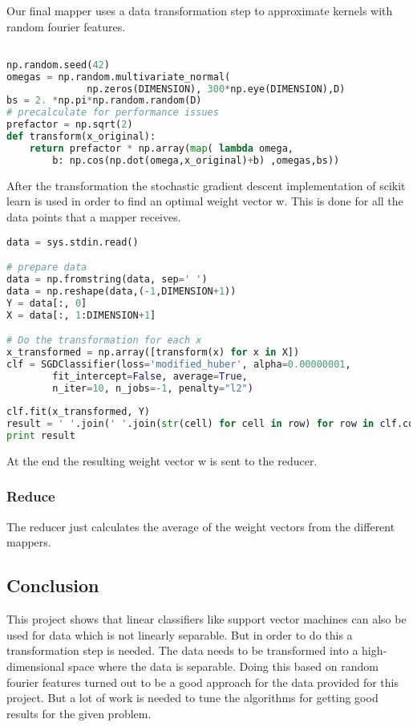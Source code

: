 \documentclass[a4paper, 11pt]{article}
\begin{document}
Our final mapper uses a data transformation step to approximate kernels with random fourier features.

\begin{lstlisting}[language=Python]

np.random.seed(42)
omegas = np.random.multivariate_normal(
              np.zeros(DIMENSION), 300*np.eye(DIMENSION),D)
bs = 2. *np.pi*np.random.random(D)
# precalculate for performance issues
prefactor = np.sqrt(2) 
def transform(x_original):
	return prefactor * np.array(map( lambda omega,
		b: np.cos(np.dot(omega,x_original)+b) ,omegas,bs))

\end{lstlisting}

After the transformation the stochastic gradient descent implementation of scikit learn is used in order to find an optimal weight vector w. This is done for all the data points that a mapper receives.

\begin{lstlisting}[language=Python]
data = sys.stdin.read()

# prepare data
data = np.fromstring(data, sep=' ')
data = np.reshape(data,(-1,DIMENSION+1))
Y = data[:, 0]
X = data[:, 1:DIMENSION+1]

# Do the transformation for each x
x_transformed = np.array([transform(x) for x in X])
clf = SGDClassifier(loss='modified_huber', alpha=0.00000001, 
		fit_intercept=False, average=True, 
		n_iter=10, n_jobs=-1, penalty="l2")
    
clf.fit(x_transformed, Y)
result = ' '.join(' '.join(str(cell) for cell in row) for row in clf.coef_)
print result

\end{lstlisting}

At the end the resulting weight vector w is sent to the reducer.

\subsubsection{Reduce}

The reducer just calculates the average of the weight vectors from the different mappers. 


\subsection{Conclusion}

This project shows that linear classifiers like support vector machines can also be used for data which is not linearly separable. But in order to do this a transformation step is needed. The data needs to be transformed into a high-dimensional space where the data is separable. Doing this based on random fourier features turned out to be a good approach for the data provided for this project. But a lot
of work is needed to tune the algorithms for getting good results for the given problem.
\end{document}

